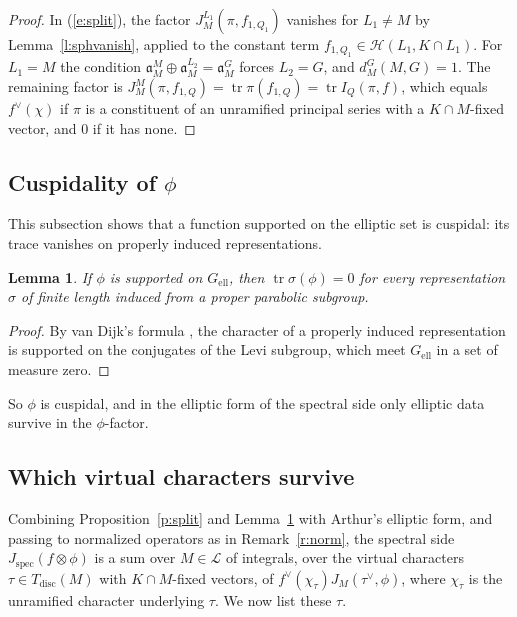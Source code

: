 \documentclass[12pt,letterpaper]{article}
\numberwithin{equation}{section}
\theoremstyle{plain}
\newtheorem{lemma}[theorem]{Lemma}
\theoremstyle{definition}
\theoremstyle{remark}
\newcommand{\Hc}{\mathcal{H}}
\newcommand{\cL}{\mathcal{L}}
\newcommand{\fa}{\mathfrak{a}}
\DeclareMathOperator{\tr}{tr}
\newcommand{\ellr}{\mathrm{ell}}
\newcommand{\Tdisc}{T_{\mathrm{disc}}}
\begin{document}
\begin{proof}
In (\ref{e:split}), the factor $J^{L_1}_M(\pi,f_{1,Q_1})$ vanishes for $L_1\ne M$ by Lemma~\ref{l:sphvanish}, applied to the constant term $f_{1,Q_1}\in\Hc(L_1,K\cap L_1)$. For $L_1=M$ the condition $\fa_M^M\oplus\fa_M^{L_2}=\fa_M^G$ forces $L_2=G$, and $d^G_M(M,G)=1$. The remaining factor is $J^M_M(\pi,f_{1,Q})=\tr\pi(f_{1,Q})=\tr I_Q(\pi,f)$, which equals $f^\vee(\chi)$ if $\pi$ is a constituent of an unramified principal series with a $K\cap M$-fixed vector, and $0$ if it has none.
\end{proof}

\subsection{Cuspidality of \texorpdfstring{$\phi$}{phi}}\label{s:cusp}

This subsection shows that a function supported on the elliptic set is cuspidal: its trace vanishes on properly induced representations.

\begin{lemma}\label{l:cusp}
If $\phi$ is supported on $G_{\ellr}$, then $\tr\sigma(\phi)=0$ for every representation $\sigma$ of finite length induced from a proper parabolic subgroup.
\end{lemma}

\begin{proof}
By van Dijk's formula \cite{vD72}, the character of a properly induced representation is supported on the conjugates of the Levi subgroup, which meet $G_{\ellr}$ in a set of measure zero.
\end{proof}

So $\phi$ is cuspidal, and in the elliptic form of the spectral side only elliptic data survive in the $\phi$-factor.

\subsection{Which virtual characters survive}\label{s:class}

Combining Proposition~\ref{p:split} and Lemma~\ref{l:cusp} with Arthur's elliptic form, and passing to normalized operators as in Remark~\ref{r:norm}, the spectral side $J_{\mathrm{spec}}(f\otimes\phi)$ is a sum over $M\in\cL$ of integrals, over the virtual characters $\tau\in\Tdisc(M)$ with $K\cap M$-fixed vectors, of $f^\vee(\chi_\tau)J_M(\tau^\vee,\phi)$, where $\chi_\tau$ is the unramified character underlying $\tau$. We now list these $\tau$.
\end{document}
